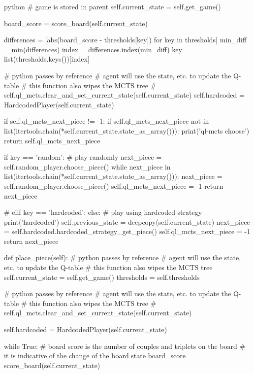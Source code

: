 \begin{mintedbox}{python}
        # game is stored in parent
        self.current_state = self.get_game()

        board_score = score_board(self.current_state)

        differences = [abs(board_score - thresholds[key])
                        for key in thresholds]
        min_diff = min(differences)
        index = differences.index(min_diff)
        key = list(thresholds.keys())[index]

        # python passes by reference
        # agent will use the state, etc. to update the Q-table
        # this function also wipes the MCTS tree
        # self.ql_mcts.clear_and_set_current_state(self.current_state)
        self.hardcoded = HardcodedPlayer(self.current_state)

        if self.ql_mcts_next_piece != -1:
            if self.ql_mcts_next_piece not in list(itertools.chain(*self.current_state.state_as_array())):
                print('ql-mcts choose')
                return self.ql_mcts_next_piece

        if key == 'random':
            # play randomly
            next_piece = self.random_player.choose_piece()
            while next_piece in list(itertools.chain(*self.current_state.state_as_array())):
                next_piece = self.random_player.choose_piece()
            self.ql_mcts_next_piece = -1
            return next_piece

        # elif key == 'hardcoded':
        else:
            # play using hardcoded strategy
            print('hardcoded')
            self.previous_state = deepcopy(self.current_state)
            next_piece = self.hardcoded.hardcoded_strategy_get_piece()
            self.ql_mcts_next_piece = -1
            return next_piece

    def place_piece(self):
        # python passes by reference
        # agent will use the state, etc. to update the Q-table
        # this function also wipes the MCTS tree
        self.current_state = self.get_game()
        thresholds = self.thresholds

        # python passes by reference
        # agent will use the state, etc. to update the Q-table
        # this function also wipes the MCTS tree
        # self.ql_mcts.clear_and_set_current_state(self.current_state)

        self.hardcoded = HardcodedPlayer(self.current_state)

        while True:
            # board score is the number of couples and triplets on the board
            # it is indicative of the change of the board state
            board_score = score_board(self.current_state)


\end{mintedbox}
